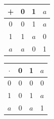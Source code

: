 \documentclass[a4paper, 11pt]{article}
\begin{document}
\begin{table}[!ht]
	\centering
	\begin{tabular}[c]{c | c c c}
		+ & 0 & 1 & $a$ \\
		\hline
		0 & 0 & 1 & $a$ \\
		1 & 1 & $a$ & 0 \\
		$a$ & $a$ & 0 & 1 \\
	\end{tabular}
	\qquad \qquad
	\begin{tabular}[c]{c | c c c}
		$\cdot$ & 0 & 1 & $a$ \\
		\hline
		0 & 0 & 0 & 0 \\
		1 & 0 & 1 & $a$ \\
		$a$ & 0 & $a$ & 1 \\
	\end{tabular}
\end{table}

\pagebreak
\end{document}
